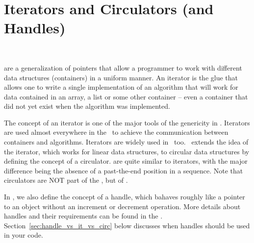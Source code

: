 
\chapter{Iterators and Circulators (and Handles)}
\label{chap:iterators_and_circulators}
\ccIndexMainItemBegin{\stl} 
 \\


are a generalization of pointers that allow a programmer to work 
with different data structures (containers) in a uniform manner. 
An iterator is the glue that allows one to write a single implementation of 
an algorithm that will work for data contained in an array, a list or some 
other container -- even a container that did not yet exist when the algorithm 
was implemented. 

The concept of an iterator is one of the major tools of the genericity
in \stl.
Iterators are used almost everywhere in the \stl\  to
achieve the communication between containers and algorithms.
Iterators are widely used in \cgal\ too.
\cgal\ extends the idea of the iterator, which works for linear data
structures, to circular data structures by defining the concept of
a circulator.  
are quite similar to iterators, with the
major difference being the absence of a past-the-end position in a sequence.
Note that circulators are NOT part of the \stl, but of \cgal.

In \cgal, we also define the concept of a handle, 
which bahaves roughly
like a pointer to an object without an increment or decrement operation.
More details about handles and their requirements can be found in 
the . 
Section~\ref{sec:handle_vs_it_vs_circ} below discusses when handles
should be used in your code.

